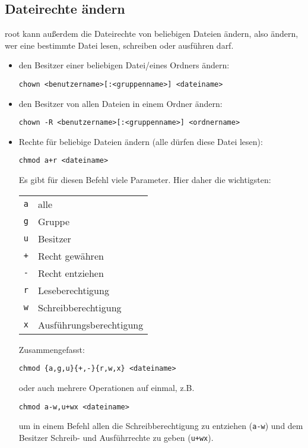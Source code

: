 \documentclass[a4paper,12pt]{article}
\begin{document}
\subsection{Dateirechte ändern}
root kann außerdem die Dateirechte von beliebigen Dateien ändern, also ändern, 
wer eine bestimmte Datei lesen, schreiben oder ausführen darf.  
\begin{itemize}
\item den Besitzer einer beliebigen Datei/eines Ordners ändern:
\begin{lstlisting}
chown <benutzername>[:<gruppenname>] <dateiname>
\end{lstlisting} 
\item den Besitzer von allen Dateien in einem Ordner ändern:
\begin{lstlisting}
chown -R <benutzername>[:<gruppenname>] <ordnername>
\end{lstlisting} 
\item Rechte für beliebige Dateien ändern (alle dürfen diese Datei lesen):
\begin{lstlisting}
chmod a+r <dateiname>
\end{lstlisting} 
Es gibt für diesen Befehl viele Parameter. Hier daher die wichtigsten:
\begin{center}
\begin{tabular}{ll}
\texttt{a} & alle \\
\texttt{g} & Gruppe \\
\texttt{u} & Besitzer \\
\texttt{+} & Recht gewähren \\
\texttt{-} & Recht entziehen \\
\texttt{r} & Leseberechtigung \\
\texttt{w} & Schreibberechtigung \\
\texttt{x} & Ausführungsberechtigung \\
\end{tabular}
\end{center} 
Zusammengefasst:
\begin{lstlisting}
chmod {a,g,u}{+,-}{r,w,x} <dateiname>
\end{lstlisting}
oder auch mehrere Operationen auf einmal, z.B.
\begin{lstlisting}
chmod a-w,u+wx <dateiname>
\end{lstlisting}
um in einem Befehl allen die Schreibberechtigung zu entziehen (\texttt{a-w}) und dem
Besitzer Schreib- und Ausführrechte zu geben (\texttt{u+wx}).

\end{itemize}   
\end{document}
